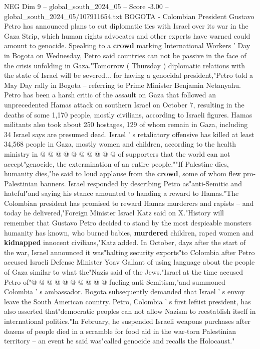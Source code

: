 \begin{textsample}{NEG Dim 9 – global\_south\_2024\_05 – Score -3.00 – global\_south\_2024\_05/107911654.txt}  \label{ex:f9_neg_410}
BOGOTA - Colombian President Gustavo Petro has announced plans to cut diplomatic ties with Israel over its war in the Gaza Strip, which human rights advocates and other experts have warned could amount to genocide.
Speaking to a \textbf{crowd} marking International Workers ' Day in Bogota on Wednesday, Petro said countries can not be passive in the face of the crisis unfolding in Gaza."Tomorrow ( Thursday ) diplomatic relations with the state of Israel will be severed... for having a genocidal president,"Petro told a May Day rally in Bogota -- referring to Prime Minister Benjamin Netanyahu.
Petro has been a harsh critic of the assault on Gaza that followed an unprecedented Hamas attack on southern Israel on October 7, resulting in the deaths of some 1,170 people, mostly civilians, according to Israeli figures.
Hamas militants also took about 250 hostages, 129 of whom remain in Gaza, including 34 Israel says are presumed dead.
Israel ' s retaliatory offensive has killed at least 34,568 people in Gaza, mostly women and children, according to the health ministry in @ @ @ @ @ @ @ @ @ @ of supporters that the world can not accept"genocide, the extermination of an entire people.""If Palestine dies, humanity dies,"he said to loud applause from the \textbf{crowd}, some of whom flew pro-Palestinian banners.
Israel responded by describing Petro as"anti-Semitic and hateful"and saying his stance amounted to handing a reward to Hamas."The Colombian president has promised to reward Hamas murderers and rapists -- and today he delivered,"Foreign Minister Israel Katz said on X."History will remember that Gustavo Petro decided to stand by the most despicable monsters humanity has known, who burned babies, \textbf{murdered} children, raped women and \textbf{kidnapped} innocent civilians,"Katz added.
In October, days after the start of the war, Israel announced it was"halting security exports"to Colombia after Petro accused Israeli Defense Minister Yoav Gallant of using language about the people of Gaza similar to what the"Nazis said of the Jews."Israel at the time accused Petro of"@ @ @ @ @ @ @ @ @ @ fueling anti-Semitism,"and summoned Colombia ' s ambassador.
Bogota subsequently demanded that Israel ' s envoy leave the South American country.
Petro, Colombia ' s first leftist president, has also asserted that"democratic peoples can not allow Nazism to reestablish itself in international politics."In February, he suspended Israeli weapons purchases after dozens of people died in a scramble for food aid in the war-torn Palestinian territory -- an event he said was"called genocide and recalls the Holocaust."

\end{textsample}
